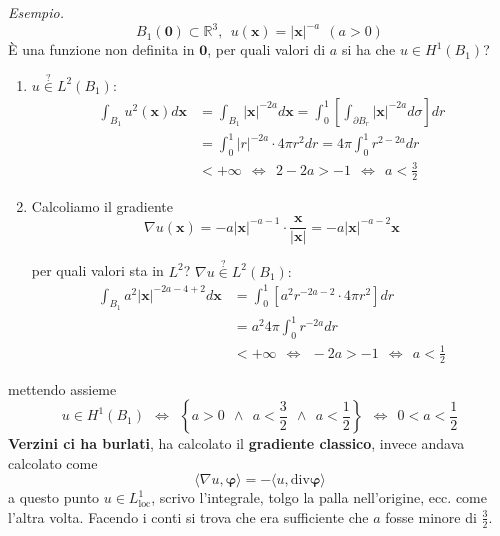 \documentclass[10pt,a4paper,twoside,openright]{book}
\begin{document}
\textit{Esempio.}
\begin{equation*}
	B_{1}(\mathbf{0}) \subset \mathbb{R}^{3} ,\ \ u(\mathbf{x}) =| \mathbf{x}| ^{-a} \ \ ( a >0)
\end{equation*}
È una funzione non definita in $\mathbf{0}$, per quali valori di $a$ si ha che $u\in H^{1}( B_{1})$?
\begin{enumerate}
	\item $u\overset{?}{\in } L^{2}( B_{1}) :$\begin{align*}
	      \int _{B_{1}} u^{2}(\mathbf{x}) d\mathbf{x} & =\int _{B_{1}}| \mathbf{x}| ^{-2a} d\mathbf{x} =\int ^{1}_{0}\left[\int _{\partial B_{r}}| \mathbf{x}| ^{-2a} d\sigma \right] dr\\
	      & =\int ^{1}_{0}| r| ^{-2a} \cdotp 4\pi r^{2} dr=4\pi \int ^{1}_{0} r^{2-2a} dr\\
	      & < +\infty \ \ \Leftrightarrow \ \ 2-2a >-1\ \ \Leftrightarrow \ \ a< \frac{3}{2}
	\end{align*}
	\item Calcoliamo il gradiente\begin{equation*}
	      \nabla u(\mathbf{x}) =-a| \mathbf{x}| ^{-a-1} \cdotp \frac{\mathbf{x}}{| \mathbf{x}| } =-a| \mathbf{x}| ^{-a-2}\mathbf{x}
	\end{equation*}
	
	per quali valori sta in $L^{2}$? $\nabla u\overset{?}{\in } L^{2}( B_{1}) :$\begin{align*}
	\int _{B_{1}} a^{2}| \mathbf{x}| ^{-2a-4+2} d\mathbf{x} & =\int ^{1}_{0}\left[ a^{2} r^{-2a-2} \cdotp 4\pi r^{2}\right] dr\\
	& =a^{2} 4\pi \int ^{1}_{0} r^{-2a} dr\\
	& < +\infty \ \ \Leftrightarrow \ \ -2a >-1\ \ \Leftrightarrow \ \ a< \frac{1}{2}
	\end{align*}
\end{enumerate}

mettendo assieme
\begin{equation*}
	u\in H^{1}( B_{1}) \ \ \Leftrightarrow \ \ \left\{a >0\ \ \land \ \ a< \frac{3}{2} \ \ \land \ \ a< \frac{1}{2}\right\} \ \ \Leftrightarrow \ \ 0< a< \frac{1}{2}
\end{equation*}
\textbf{Verzini ci ha burlati}, ha calcolato il \textbf{gradiente classico}, invece andava calcolato come
\begin{equation*}
	\langle \nabla u,\mathbf{\varphi } \rangle =-\langle u,\mathrm{div}\mathbf{\varphi } \rangle 
\end{equation*}
a questo punto $u\in L^{1}_{\mathrm{loc}}$, scrivo l'integrale, tolgo la palla nell'origine, ecc. come l'altra volta. Facendo i conti si trova che era sufficiente che $a$ fosse minore di $\frac{3}{2}$.
\end{document}
